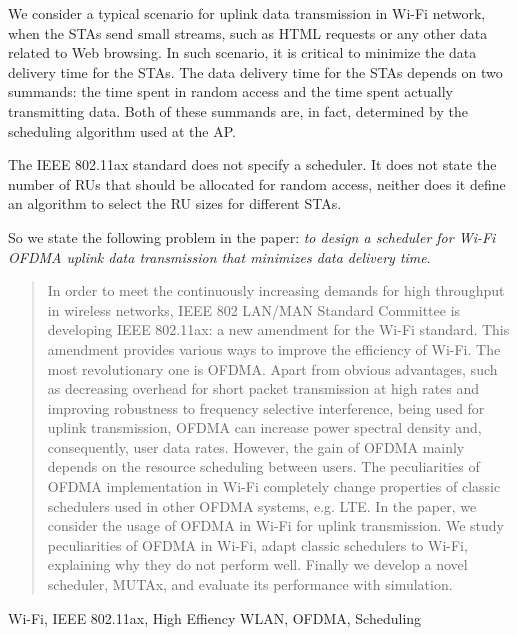 We consider a typical scenario for uplink data transmission in Wi-Fi network, when the STAs send small streams, such as HTML requests or any other data related to Web browsing.
In such scenario, it is critical to minimize the data delivery time for the STAs.
The data delivery time for the STAs depends on two summands: the time spent in random access and the time spent actually transmitting data.
Both of these summands are, in fact, determined by the scheduling algorithm used at the AP.

The IEEE 802.11ax standard does not specify a scheduler.
It does not state the number of RUs that should be allocated for random access, neither does it define an algorithm to select the RU sizes for different STAs.

So we state the following problem in the paper: \emph{to design a scheduler for Wi-Fi OFDMA uplink data transmission that minimizes data delivery time}.

\clearpage

\begin{abstract}
In order to meet the continuously increasing demands for high throughput in wireless networks, IEEE 802 LAN/MAN Standard Committee is developing IEEE 802.11ax: a new amendment for the Wi-Fi standard.
This amendment provides various ways to improve the efficiency of Wi-Fi. The most revolutionary one is OFDMA.
Apart from obvious advantages, such as decreasing overhead for short packet transmission at high rates and improving robustness to frequency selective interference, being used for uplink transmission, OFDMA can increase power spectral density and, consequently, user data rates. However, the gain of OFDMA mainly depends on the resource scheduling between users.
The peculiarities of OFDMA implementation in Wi-Fi completely change properties of classic schedulers used in other OFDMA systems, e.g. LTE. 
In the paper, we consider the usage of OFDMA in Wi-Fi for uplink transmission.
We study peculiarities of OFDMA in Wi-Fi, adapt classic schedulers to Wi-Fi, explaining why they do not perform well.
Finally we develop a novel scheduler, MUTAx, and evaluate its performance with simulation. 
\end{abstract}

\begin{IEEEkeywords}
Wi-Fi, IEEE 802.11ax, High Effiency WLAN, OFDMA, Scheduling
\end{IEEEkeywords}

